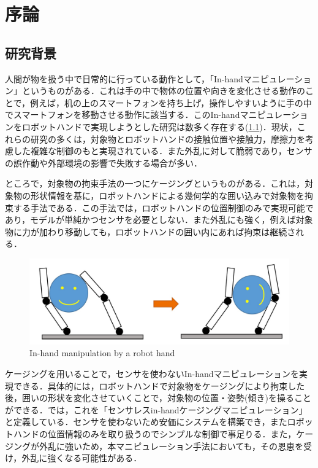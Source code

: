 \documentclass[a4paper,twoside,12pt,papersize, dvipdfmx]{iirthesis}
\begin{document}
    \newcommand{\figref}[1]{\figurename\ref{#1}}
    \newcommand{\tabref}[1]{\tablename\ref{#1}}
    \renewcommand{\eqref}[1]{式~(\ref{#1})}
    \newcommand{\chapref}[1]{\ref{#1}章}
    \newcommand{\secref}[1]{\ref{#1}節}
    \newcommand{\ssecref}[1]{\ref{#1}項}
    \newcommand{\appref}[1]{付録\ref{#1}}
\fi


\chapter{序論}\label{chap::intro}
\minitoc

\section{研究背景}\label{sec::intro::background}
人間が物を扱う中で日常的に行っている動作として，「In-handマニピュレーション」というものがある．これは手の中で物体の位置や向きを変化させる動作のことで，例えば，机の上のスマートフォンを持ち上げ，操作しやすいように手の中でスマートフォンを移動させる動作に該当する．このIn-handマニピュレーションをロボットハンドで実現しようとした研究は数多く存在する(\figref{fig::intro::ihm})．現状，これらの研究の多くは，対象物とロボットハンドの接触位置や接触力，摩擦力を考慮した複雑な制御のもと実現されている．また外乱に対して脆弱であり，センサの誤作動や外部環境の影響で失敗する場合が多い．\par

ところで，対象物の拘束手法の一つにケージング\cite{rimon1999}というものがある．これは，対象物の形状情報を基に，ロボットハンドによる幾何学的な囲い込みで対象物を拘束する手法である．この手法では，ロボットハンドの位置制御のみで実現可能であり，モデルが単純かつセンサを必要としない．また外乱にも強く，例えば対象物に力が加わり移動しても，ロボットハンドの囲い内にあれば拘束は継続される．　\par

\begin{figure}[b]
\centering
\includegraphics[width=0.7\hsize]{fig/1-introduction/in-hand.jpg}
\caption{In-hand manipulation by a robot hand \cite{komiyama2021}}
\label{fig::intro::ihm}
\end{figure}

ケージングを用いることで，センサを使わないIn-handマニピュレーションを実現できる．具体的には，ロボットハンドで対象物をケージングにより拘束した後，囲いの形状を変化させていくことで，対象物の位置・姿勢(傾き)を操ることができる．\cite{komiyama2021}では，これを「センサレスin-handケージングマニピュレーション」と定義している．センサを使わないため安価にシステムを構築でき，またロボットハンドの位置情報のみを取り扱うのでシンプルな制御で事足りる．また，ケージングが外乱に強いため，本マニピュレーション手法においても，その恩恵を受け，外乱に強くなる可能性がある．
\end{document}
